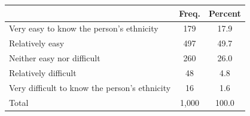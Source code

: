 \begin{tabular}{lcc}
\toprule
& Freq. & Percent \\
\midrule
Very easy to know the person's ethnicity & 179 & 17.9 \\
Relatively easy & 497 & 49.7 \\
Neither easy nor difficult & 260 & 26.0 \\
Relatively difficult &  48 & 4.8 \\
Very difficult to know the person's ethnicity &  16 & 1.6 \\
\midrule
Total & 1,000 & 100.0 \\
\bottomrule
\end{tabular}
